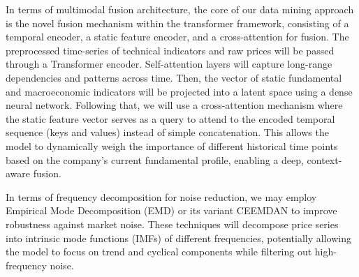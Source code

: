 In terms of multimodal fusion architecture, the core of our data mining approach is the novel fusion mechanism within the transformer framework, consisting of a temporal encoder, a static feature encoder, and a cross-attention for fusion. The preprocessed time-series of technical indicators and raw prices will be passed through a Transformer encoder. Self-attention layers will capture long-range dependencies and patterns across time. Then, the vector of static fundamental and macroeconomic indicators will be projected into a latent space using a dense neural network. Following that, we will use a cross-attention mechanism where the static feature vector serves as a query to attend to the encoded temporal sequence (keys and values) instead of simple concatenation. This allows the model to dynamically weigh the importance of different historical time points based on the company's current fundamental profile, enabling a deep, context-aware fusion.

In terms of frequency decomposition for noise reduction, we may employ Empirical Mode Decomposition (EMD) or its variant CEEMDAN to improve robustness against market noise. These techniques will decompose price series into intrinsic mode functions (IMFs) of different frequencies, potentially allowing the model to focus on trend and cyclical components while filtering out high-frequency noise.

